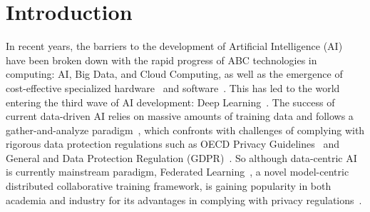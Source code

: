 \section{Introduction}


In recent years, the barriers to the development of Artificial Intelligence (AI) have been broken down with the rapid progress of ABC technologies in computing: AI, Big Data, and Cloud Computing, as well as the emergence of cost-effective specialized hardware~\cite{sze2017efficient} and software~\cite{jia2014caffe}. This has led to the world entering the third wave of AI development: Deep Learning~\cite{lecun2015deep}.
The success of current data-driven AI relies on massive amounts of training data and follows a gather-and-analyze paradigm~\cite{whang2023data}, which confronts with challenges of complying with rigorous data protection regulations such as OECD Privacy Guidelines~\cite{tene2011privacy} and General and Data Protection Regulation (GDPR)~\cite{voigt2017eu}.
So although data-centric AI is currently mainstream paradigm, Federated Learning~\cite{li2020federated}, a novel model-centric distributed collaborative training framework, is gaining popularity in both academia and industry for its advantages in complying with privacy regulations~\cite{truong2021privacy}.


